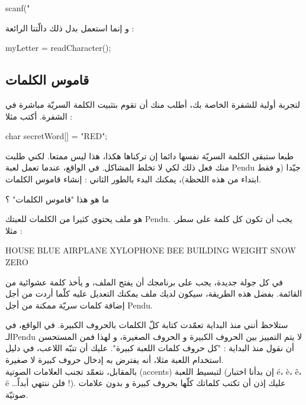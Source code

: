 \begin{Csource}
scanf("%
\end{Csource}

و إنما استعمل بدل ذلك دالّتنا الرائعة :

\begin{Csource}
myLetter = readCharacter();
\end{Csource}

\subsection{قاموس الكلمات}
لتجربة أولية للشفرة الخاصة بك، أطلب منك أن تقوم بتثبيت الكلمة السريّة مباشرة في الشفرة. أكتب مثلا :

\begin{Csource}
char secretWord[] = "RED";
\end{Csource}

طبعا ستبقى الكلمة السريّة نفسها دائما إن تركناها هكذا، هذا ليس ممتعا. لكني طلبت منك فعل ذلك لكي لا تخلط المشاكل. في الواقع، عندما تعمل لعبة
\textenglish{Pendu}
جيّدا (و فقط ابتداء من هذه اللحظة)، يمكنك البدء بالطور الثاني : إنشاء قاموس الكلمات.

\begin{question}
ما هو هذا "قاموس الكلمات" ؟
\end{question}

هو ملف يحتوي كثيرا من الكلمات للعبتك
\textenglish{Pendu}.
يجب أن تكون كل كلمة على سطر. مثلا :

\begin{Console}
HOUSE
BLUE
AIRPLANE
XYLOPHONE
BEE
BUILDING
WEIGHT
SNOW
ZERO
\end{Console}

في كل جولة جديدة، يجب على برنامجك أن يفتح الملف، و يأخذ كلمة عشوائية من القائمة. بفضل هذه الطريقة، سيكون لديك ملف يمكنك التعديل عليه كلّما أردت من أجل إضافة كلمات سريّة ممكنة من أجل
\textenglish{Pendu}.

\begin{information}
ستلاحظ أنني منذ البداية تعمّدت كتابة كلّ الكلمات بالحروف الكبيرة. في الواقع، في الـ\textenglish{Pendu}
لا يتم التمييز بين الحروف الكبيرة و الحروف الصغيرة، و لهذا فمن المستحسن أن نقول منذ البداية : "كل حروف كلمات اللعبة كبيرة". عليك أن تنبّه اللاعب، في دليل استخدام اللعبة مثلا، أنه يفترض به إدخال حروف كبيرة لا صغيرة.\\
بالمقابل، نتعمّد تجنب العلامات الصوتية
(\textenglish{accents})
لتبسيط اللعبة (إن بدأنا اختبار \textenglish{é}، \textenglish{è}، \textenglish{ê}، \textenglish{ë} \dots فلن ننتهي أبداً !). عليك إذن أن تكتب كلماتك كلّها بحروف كبيرة و بدون علامات صوتيّة.
\end{information}

